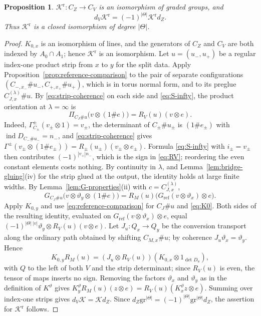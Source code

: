 \documentclass[11pt]{amsart}
\newtheorem{proposition}[theorem]{Proposition}
\theoremstyle{definition}
\theoremstyle{remark}
\theoremstyle{plain}
\numberwithin{equation}{section}
\newcommand{\eps}{\mathrm{gr}}
\newcommand{\ind}{\operatorname{ind}}
\begin{document}
\begin{proposition}\label{prop:KR-closed}
$\mathcal K^{\mathrm r}:C_Z\to C_V$ is an isomorphism of graded groups, and
\[
 d_V\mathcal K^{\mathrm r}=(-1)^{|\Theta|}\mathcal K^{\mathrm r}d_Z .
\]
Thus $\mathcal K^{\mathrm r}$ is a closed isomorphism of degree $|\Theta|$.
\end{proposition}
\begin{proof}
$K_{0,x}$ is an isomorphism of lines, and the generators of $C_Z$ and
$C_V$ are both indexed by $A_0\cap A_1$; hence $\mathcal K^{\mathrm r}$ is an
isomorphism. Let $u=(u_-,u_+)$ be a regular index-one product strip
from $x$ to $y$ for the split data. Apply
Proposition~\ref{prop:reference-comparison} to the pair of separate
configurations $(C_{-,x_-}\#u_-,C_{+,x_+}\#u_+)$, which is in torus
normal form, and to its preglue $C^{(\lambda)}_{J,x}\#u$. By
\eqref{eq:strip-coherence} on each side and \eqref{eq:S-infty}, the
product orientation at $\lambda=\infty$ is
\[
 \Pi_{C_J\#u}\bigl(v\otimes(1\# e)\bigr)=R_V(u)(v\otimes e).
\]
Indeed, $\Gamma^\pm_{C_\pm}(v_\pm\otimes1)=v_\pm$, the determinant of
$C_{\pm}\#u_\pm$ is $(1\# e_\pm)$ with
$\ind D_{C_-\#u_-}=n_-$, and \eqref{eq:strip-coherence} gives
$\Gamma^\pm(v_\pm\otimes(1\# e_\pm))=R_\pm(u_\pm)(v_\pm\otimes e_\pm)$.
Formula \eqref{eq:S-infty} with $i_\pm=v_\pm$ then contributes
$(-1)^{|v_+|n_-}$, which is the sign in \eqref{eq:RV}; reordering the
even constant elements costs nothing. By continuity in $\lambda$, and
Lemma~\ref{lem:bridge-gluing}(iv) for the strip glued at the output,
the identity holds at large finite widths. By
Lemma~\ref{lem:G-properties}(ii) with $c=C^{(\lambda)}_{J,x}$,
\[
 G_{C_J\#u}\bigl(v\otimes \vartheta_y\otimes(1\# e)\bigr)
 =R_M(u)\bigl(G_{\mathrm{ref}}(v\otimes \vartheta_x)\otimes e\bigr).
\]
Apply $K_{0,y}$ and use \eqref{eq:reference-comparison} for
$C_J\#u$ and \eqref{eq:K0}. Both sides of the resulting identity,
evaluated on $G_{\mathrm{ref}}(v\otimes \vartheta_x)\otimes e$, equal
$(-1)^{|\Theta|\,|v|}\vartheta_y\otimes R_V(u)(v\otimes e)$. Let $J_u:Q_x\to Q_y$ be the conversion transport along the ordinary
path obtained by shifting $C_{M,x}\#u$; by coherence $J_u\vartheta_x=\vartheta_y$.
Hence
\[
 K_{0,y}R_M(u)=(J_u\otimes R_V(u))(K_{0,x}\otimes1_{\det D_u}),
\]
with $Q$ to the left of both $V$ and the strip determinant; since
$R_V(u)$ is even, the tensor of maps inserts no sign. Removing the
factors $\vartheta_x$ and $\vartheta_y$ as in the definition of $K^\vartheta$ gives
$K^\vartheta_yR_M(u)(z\otimes e)=R_V(u)(K^\vartheta_xz\otimes e)$. Summing over
index-one strips gives $d_V\mathcal K=\mathcal Kd_Z$. Since
$d_Z\eps^{|\Theta|}=(-1)^{|\Theta|}\eps^{|\Theta|}d_Z$, the assertion for $\mathcal K^{\mathrm r}$ follows.
\end{proof}
\end{document}
